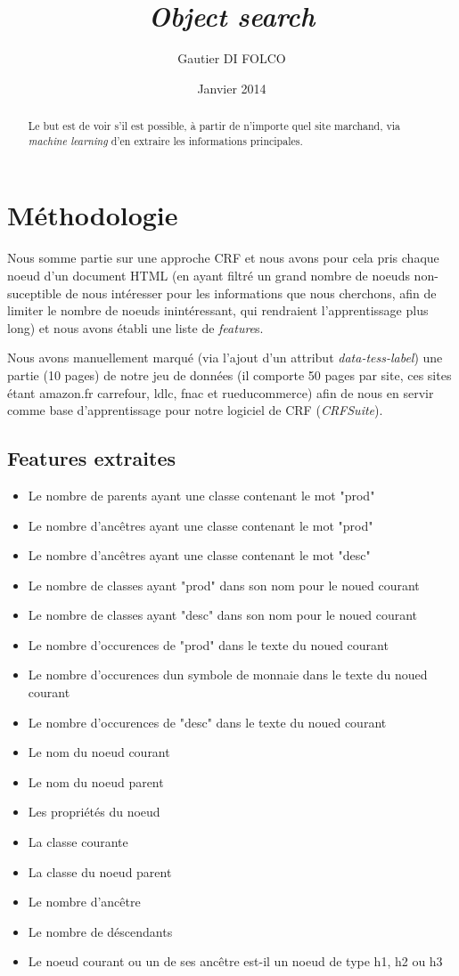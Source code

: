 \documentclass{article}
\title{\emph{Object search}}
\author{Gautier DI FOLCO}
\date{Janvier 2014}
\begin{document}
\maketitle
\tableofcontents

\begin{abstract}
Le but est de voir s'il est possible, à partir de n'importe quel site marchand,
via \emph{machine learning} d'en extraire les informations principales.
\end{abstract}

\section{Méthodologie}
Nous somme partie sur une approche CRF et nous avons pour cela pris chaque noeud
d'un document HTML (en ayant filtré un grand nombre de noeuds non-suceptible de
nous intéresser pour les informations que nous cherchons, afin de limiter le nombre de
noeuds inintéressant, qui rendraient l'apprentissage plus long) et nous avons établi
une liste de \emph{feature}s.

Nous avons manuellement marqué (via l'ajout d'un attribut \emph{data-tess-label})
une partie (10 pages) de notre jeu de données (il comporte 50 pages par site,
ces sites étant amazon.fr carrefour, ldlc, fnac et rueducommerce) afin de nous
en servir comme base d'apprentissage pour notre logiciel de CRF (\emph{CRFSuite}).

\subsection{Features extraites}

\begin{itemize}
 \item Le nombre de parents ayant une classe contenant le mot "prod"
 \item Le nombre d'ancêtres ayant une classe contenant le mot "prod"
 \item Le nombre d'ancêtres ayant une classe contenant le mot "desc"
 \item Le nombre de classes ayant "prod" dans son nom pour le noued courant
 \item Le nombre de classes ayant "desc" dans son nom pour le noued courant
 \item Le nombre d'occurences de "prod" dans le texte du noued courant
 \item Le nombre d'occurences dun symbole de monnaie dans le texte du noued courant
 \item Le nombre d'occurences de "desc" dans le texte du noued courant
 \item Le nom du noeud courant
 \item Le nom du noeud parent
 \item Les propriétés du noeud
 \item La classe courante
 \item La classe du noeud parent
 \item Le nombre d'ancêtre
 \item Le nombre de déscendants
 \item Le noeud courant ou un de ses ancêtre est-il un noeud de type h1, h2 ou h3
\end{itemize}
\end{document}
